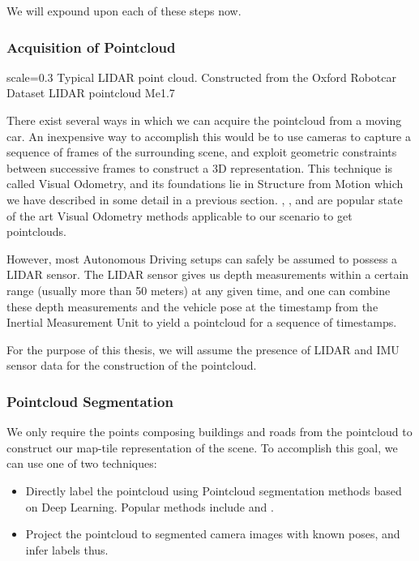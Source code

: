We will expound upon each of these steps now.

\subsubsection{Acquisition of Pointcloud}

{scale=0.3}%
{Typical LIDAR point cloud. Constructed from the Oxford Robotcar Dataset}%
{LIDAR pointcloud}%
{Me1.7}

There exist several ways in which we can acquire the pointcloud from a moving car. An inexpensive way to accomplish this would be to use cameras to capture a sequence of frames of the surrounding scene, and exploit geometric constraints between successive frames to construct a 3D representation. This technique is called Visual Odometry, and its foundations lie in Structure from Motion which we have described in some detail in a previous section. \cite{Mur-Artal2018}, \cite{Schops2019}, and \cite{Das2018} are popular state of the art Visual Odometry methods applicable to our scenario to get pointclouds.

However, most Autonomous Driving setups can safely be assumed to possess a LIDAR sensor. The LIDAR sensor gives us depth measurements within a certain range (usually more than 50 meters) at any given time, and one can combine these depth measurements and the vehicle pose at the timestamp from the Inertial Measurement Unit to yield a pointcloud for a sequence of timestamps. 

For the purpose of this thesis, we will assume the presence of LIDAR and IMU sensor data for the construction of the pointcloud. 

\subsubsection{Pointcloud Segmentation}

We only require the points composing buildings and roads from the pointcloud to construct our map-tile representation of the scene. To accomplish this goal, we can use one of two techniques: 

\begin{itemize}
	\item Directly label the pointcloud using Pointcloud segmentation methods based on Deep Learning. Popular methods include \cite{qi2016} and \cite{alnaggar2020}.\\
	
	\item Project the pointcloud to segmented camera images with known poses, and infer labels thus. 
\end{itemize}

